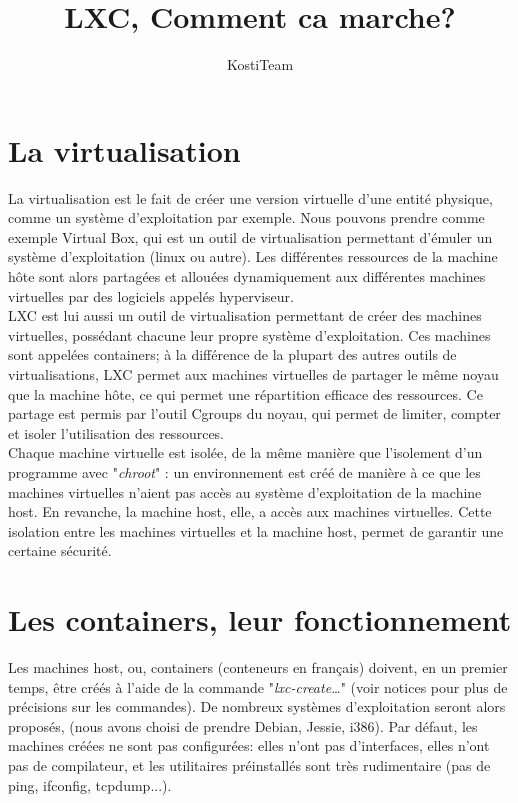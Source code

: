 \documentclass{article}
\author{KostiTeam}
\title{LXC, Comment ca marche?}
\begin{document}
\maketitle
\newpage
\tableofcontents
\newpage

\section{La virtualisation}
La virtualisation est le fait de cr\'eer une version virtuelle d'une entit\'e physique, comme un syst\`eme 
d'exploitation par exemple. Nous pouvons prendre comme exemple Virtual Box, qui est un outil de virtualisation 
permettant d'\'emuler un syst\`eme d'exploitation (linux ou autre). Les diff\'erentes ressources de la machine 
h\^ote sont alors partag\'ees et allou\'ees dynamiquement aux diff\'erentes machines virtuelles par des logiciels
appel\'es hyperviseur.\\

LXC est lui aussi un outil de virtualisation permettant de cr\'eer des machines virtuelles, poss\'edant 
chacune leur propre syst\`eme d'exploitation. Ces machines sont appel\'ees containers; \`a la diff\'erence 
de la plupart des autres outils de virtualisations, LXC permet aux machines virtuelles de partager le
m\^eme noyau que la machine h\^ote, ce qui permet une r\'epartition efficace des ressources. Ce partage est 
permis par l'outil Cgroups du noyau, qui permet de limiter, compter et isoler l'utilisation des ressources.\\

Chaque machine virtuelle est isol\'ee, de la m\^eme mani\`ere que l'isolement d'un programme avec "\emph{chroot}"
: un environnement est cr\'e\'e de mani\`ere \`a ce que les machines virtuelles n'aient pas acc\`es au syst\`eme 
d'exploitation de la machine host. En revanche, la machine host, elle, a acc\`es aux machines virtuelles.
Cette isolation entre les machines virtuelles et la machine host, permet de garantir une certaine s\'ecurit\'e.\\


\section{Les containers, leur fonctionnement}
Les machines host, ou, containers (conteneurs en français)  doivent, en un premier temps, \^etre cr\'e\'es 
\`a l'aide de la commande "\emph{lxc-create…}" (voir notices pour plus de pr\'ecisions sur les commandes). De
nombreux syst\`emes d'exploitation seront alors propos\'es, (nous avons choisi de prendre Debian, Jessie,
i386). Par d\'efaut, les machines cr\'e\'ees ne sont pas configur\'ees: elles n'ont pas d'interfaces, elles 
n'ont pas de compilateur, et les utilitaires pr\'einstall\'es sont tr\`es rudimentaire (pas de ping, ifconfig, tcpdump...).\\
\end{document}
